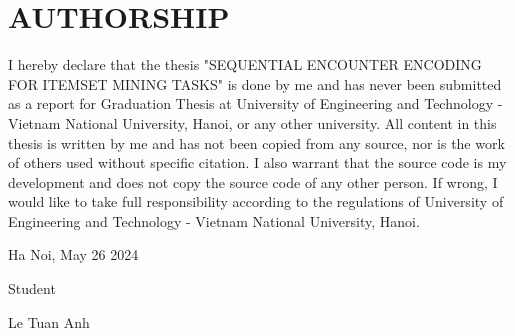 \chapter*{AUTHORSHIP}
\fontsize{13}{15}\selectfont

I hereby declare that the thesis "SEQUENTIAL ENCOUNTER ENCODING FOR
ITEMSET MINING TASKS" is done by me and has never been submitted as a report for Graduation Thesis at University of Engineering and Technology - Vietnam National University, Hanoi, or any other university. All content in this thesis is written by me and has not been copied from any source, nor is the work of others used without specific citation.
I also warrant that the source code is my development and does not copy the source code of any other person.
If wrong, I would like to take full responsibility according to the regulations of University of Engineering and Technology - Vietnam National University, Hanoi.

\vspace{0.5cm}

\begin{flushright}
    Ha Noi, May 26 2024 \par
    Student\hspace*{0.8cm}\par
    \vspace{2.5cm}
    Le Tuan Anh\par
\end{flushright}